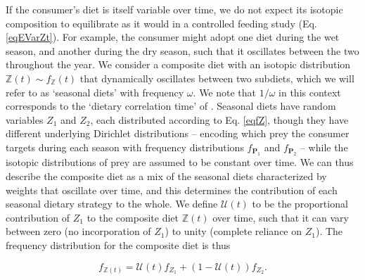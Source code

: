 \documentclass{article}
\begin{document}
If the consumer's diet is itself variable over time, we do not expect its isotopic composition to equilibrate as it would in a controlled feeding study (Eq. \ref{eqEVarZt}).
For example, the consumer might adopt one diet during the wet season, and another during the dry season, such that it oscillates between the two throughout the year.
We consider a composite diet with an isotopic distribution $\mathbb{Z}(t) \sim f_{\mathbb{Z}}(t)$ that dynamically oscillates between two subdiets, which we will refer to as `seasonal diets' with frequency $\omega$.
We note that $1/\omega$ in this context corresponds to the `dietary correlation time' of \citet{Fink:2012eg}.
Seasonal diets have random variables $Z_1$ and $Z_2$, each distributed according to Eq. \ref{eqfZ}, though they have different underlying Dirichlet distributions -- encoding which prey the consumer targets during each season with frequency distributions $f_{\bm P_1}$ and $f_{\bm P_2}$ -- while the isotopic distributions of prey are assumed to be constant over time.
We can thus describe the composite diet as a mix of the seasonal diets characterized by weights that oscillate over time, and this determines the contribution of each seasonal dietary strategy to the whole.
We define $\mathcal{U}(t)$ to be the proportional contribution of $Z_1$ to the composite diet $\mathbb{Z}(t)$ over time, such that it can vary between zero (no incorporation of $Z_1$) to unity (complete reliance on $Z_1$).
The frequency distribution for the composite diet is thus


\begin{equation}
  f_{\mathbb{Z}(t)} = \mathcal{U}(t) f_{Z_1} + (1-\mathcal{U}(t)) f_{Z_2}. %
\end{equation}

\end{document}
